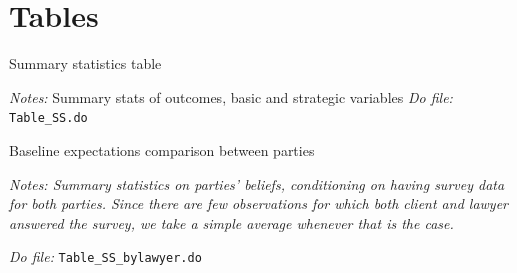 \documentclass[11pt]{article}
\begin{document}



\pagebreak
\nocite{*}

%
%
\printbibliography



\section{Tables}


\begin{table}[H]
    \caption{Summary statistics table }
    \label{tab:SS}
    \begin{center}
        \tiny{}
    \end{center}
    \footnotesize
    \textit{Notes:} 
Summary stats of outcomes, basic and strategic variables
    \textit{Do file: } \texttt{Table\_SS.do}
\end{table}


\begin{table}[H]
    \caption{Baseline expectations comparison between parties}
    \label{Table_expectations_plaintiff_defendant}
    \begin{center}
       \scriptsize{}
    \end{center}
    \footnotesize    
    \textit{Notes: Summary statistics on parties' beliefs, conditioning on having survey data for both parties. Since there are few observations for which both client and lawyer answered the survey, we take a simple average whenever that is the case.} 
    
    \textit{Do file: } \texttt{Table\_SS\_bylawyer.do}
\end{table}

\pagebreak


\end{document}
